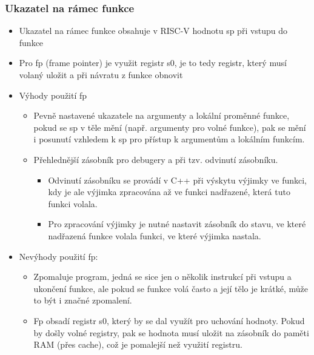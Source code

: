 \documentclass{beamer}
\begin{document}
\begin{frame}[shrink=5]
\frametitle{Ukazatel na rámec funkce}

\begin{itemize}
 \item Ukazatel na rámec funkce obsahuje v RISC-V hodnotu sp při vstupu do funkce
 \item Pro fp (frame pointer) je využit registr s0, je to tedy registr, který musí volaný uložit a při návratu z funkce obnovit
 \item Výhody použití fp
\begin{itemize}
 \item Pevně nastavené ukazatele na argumenty a lokální proměnné funkce, pokud se sp v těle mění (např. argumenty pro volné funkce), pak se mění i posunutí vzhledem k sp pro přístup k argumentům a lokálním funkcím.
 \item Přehlednější zásobník pro debugery a při tzv. odvinutí zásobníku.
\begin{itemize}
 \item Odvinutí zásobníku se provádí v C++ při výskytu výjimky ve funkci, kdy je ale výjimka zpracována až ve funkci nadřazené, která tuto funkci volala.
 \item Pro zpracování výjimky je nutné nastavit zásobník do stavu, ve které nadřazená funkce volala funkci, ve které výjimka nastala.
\end{itemize}
\end{itemize}
 \item Nevýhody použití fp:
\begin{itemize}
 \item Zpomaluje program, jedná se sice jen o několik instrukcí při vstupu a ukončení funkce, ale pokud se funkce volá často a její tělo je krátké, může to být i značné zpomalení.
 \item Fp obsadí registr s0, který by se dal využít pro uchování hodnoty. Pokud by došly volné registry, pak se hodnota musí uložit na zásobník do paměti RAM (přes cache), což je pomalejší než využití registru.
\end{itemize}
\end{itemize}
\end{frame}
\end{document}
